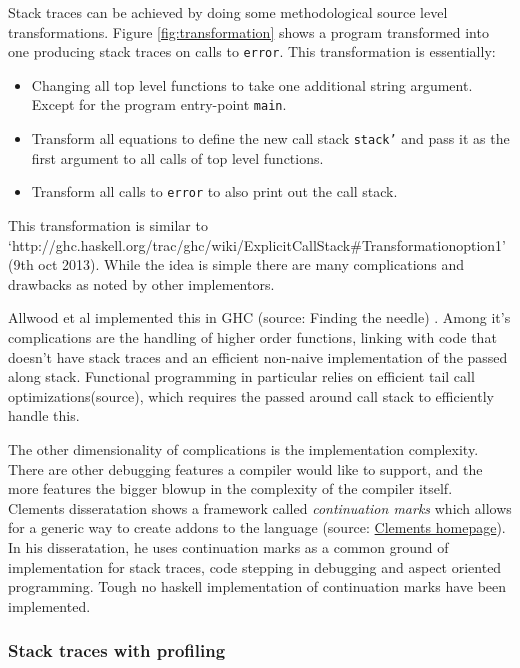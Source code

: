 Stack traces can be achieved by doing some methodological source level
transformations. Figure \ref{fig:transformation} shows a program transformed
into one producing stack traces on calls to \texttt{error}. This transformation is essentially:

\begin{itemize}
\itemsep1pt\parskip0pt
\item
  Changing all top level functions to take one additional string
  argument. Except for the program entry-point \texttt{main}.
\item
  Transform all equations to define the new call stack \texttt{stack'} and
  pass it as the first argument to all calls of top level functions.
\item
  Transform all calls to \texttt{error} to also print out the call stack.
\end{itemize}

This transformation is similar to
`http://ghc.haskell.org/trac/ghc/wiki/ExplicitCallStack\#Transformationoption1'
(9th oct 2013). While the idea is simple there are many complications and
drawbacks as noted by other implementors.

Allwood et al implemented this in GHC (source: Finding the needle) . Among it's complications are the
handling of higher order functions, linking with code that doesn't have stack
traces and an efficient non-naive implementation of the
passed along stack. Functional programming in particular relies on efficient
tail call optimizations(source), which requires the passed around call stack to
efficiently handle this.

The other dimensionality of complications is the implementation complexity.
There are other debugging features a compiler would like to support, and the
more features the bigger blowup in the complexity of the compiler itself.
Clements disseratation shows a framework called \emph{continuation marks} which
allows for a generic way to create addons to the language (source:
\href{http://www.brinckerhoff.org/clements/papers/index.html}{Clements
  homepage}).  In his disseratation, he uses continuation marks as a common
ground of implementation for stack traces, code stepping in debugging and
aspect oriented programming.  Tough no haskell implementation of continuation
marks have been implemented.

\subsubsection{Stack traces with profiling}

